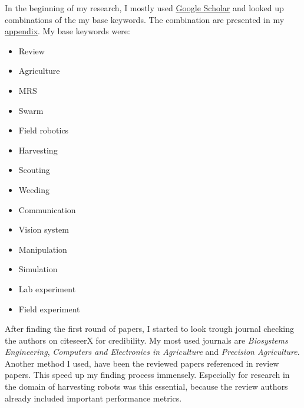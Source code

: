     In the beginning of my research, I mostly used \href{https://scholar.google.com}{Google Scholar} and looked up combinations of the my base keywords. The combination are presented in my \hyperref[sec:keywords]{appendix}. My base keywords were:
    \begin{itemize}
        \item Review
        \item Agriculture
        \item MRS
        \item Swarm
        \item Field robotics
        \item Harvesting
        \item Scouting
        \item Weeding
        \item Communication
        \item Vision system
        \item Manipulation
        \item Simulation
        \item Lab experiment
        \item Field experiment
    \end{itemize}

    After finding the first round of papers, I started to look trough journal checking the authors on citeseerX for credibility. My most used journals are \emph{Biosystems Engineering}, \emph{Computers and Electronics in Agriculture} and \emph{Precision Agriculture}.
     Another method I used, have been the reviewed papers referenced in review papers. This speed up my finding process immensely. Especially for research in the domain of harvesting robots was this essential, because the review authors already included important performance metrics.
        





